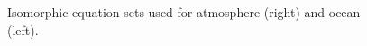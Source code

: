 \begin{figure}
  \begin{center}
  \end{center}
\caption{Isomorphic equation sets used for atmosphere (right) and
ocean (left).}
\label{fig:isomorphic-equations}
\end{figure}
